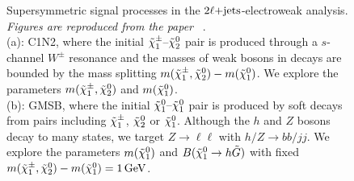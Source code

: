 \begin{figure}[t]
\caption{%
Supersymmetric signal processes in the $\twoljets$-electroweak
analysis.
\emph{Figures are reproduced from the paper%
}~\cite{atlas2022searches, atlas_susy_feynman}.
\\[0.5em]
(a): C1N2, where the initial $\chargino_1\textrm{--}\neutralino_2$ pair
is produced through a $s$-channel $W^{\pm}$ resonance and the masses of
weak bosons in decays are bounded by the mass splitting
$m(\chargino_1, \neutralino_2) - m(\neutralino_1)$.
We explore the parameters
$m(\chargino_1, \neutralino_2)$ and $m(\neutralino_1)$.
\\[0.5em]
(b): GMSB, where the initial $\neutralino_1\textrm{--}\neutralino_1$ pair
is produced by soft decays from pairs including $\chargino_1$,
$\neutralino_2$ or $\neutralino_1$.
Although the $h$ and $Z$ bosons decay to many states, we target
$Z\rightarrow \ell\ell$ with
$h/Z\rightarrow bb/jj$.
We explore the parameters
$m(\neutralino_1)$ and $B(\neutralino_1 \rightarrow h \tilde{G})$ with fixed
$m(\chargino_1, \neutralino_2) - m(\neutralino_1) = 1\,\eV[G]$.
}
\label{fig:2ljets_signal_diagrams}
\end{figure}



